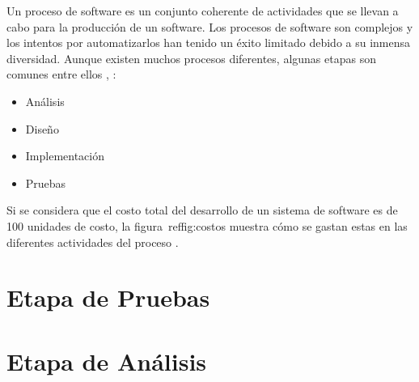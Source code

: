 Un proceso de software es un conjunto coherente de actividades que se llevan a cabo para la producción de un software. Los procesos de software son complejos y los intentos por automatizarlos han tenido un éxito limitado debido a su inmensa diversidad. Aunque existen muchos procesos diferentes, algunas etapas son comunes entre ellos \cite{sommerville1992software}, \cite{pressman2005software}:
\begin{itemize}
	\item Análisis
	\item Diseño
	\item Implementación
	\item Pruebas
\end{itemize}


Si se considera que el costo total del desarrollo de un sistema de software es de 100 unidades de costo, la figura~ref{fig:costos}  muestra cómo se gastan estas en las diferentes actividades del proceso \cite{sommerville1992software}. 


\section{Etapa de Pruebas}

\section{Etapa de Análisis}



